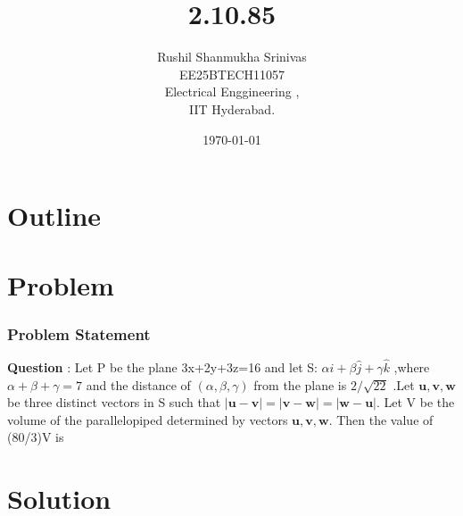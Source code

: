 \documentclass{beamer}
\title{2.10.85}
\author{Rushil Shanmukha Srinivas \\EE25BTECH11057 \\ Electrical Enggineering ,\\IIT Hyderabad.}
\date{\today}
\theoremstyle{remark}
\let\vec\mathbf
\numberwithin{equation}{section}
\begin{document}
 

\begin{frame}
\titlepage
\end{frame}

\section*{Outline}
\begin{frame}
\tableofcontents
\end{frame}
\section{Problem}
\begin{frame}
\frametitle{Problem Statement}
\textbf{Question} : Let P be the plane 3x+2y+3z=16 and let S: $\alpha\hat{i} + \beta\hat{j} + \gamma\hat{k} $ ,where $\alpha+\beta+\gamma=7$ and the distance of $(\alpha,\beta,\gamma)$ from the plane is $2/{\sqrt{22}}$ .Let $\vec{u},\vec{v},\vec{w}$ be three distinct vectors in S such that $|\vec{u}-\vec{v}|=|\vec{v}-\vec{w}|=|\vec{w}-\vec{u}|$. Let V be the volume of the parallelopiped determined by vectors $\vec{u},\vec{v},\vec{w}$. Then the value of (80/3)V is 

\end{frame}
\section{Solution}
\end{document}
